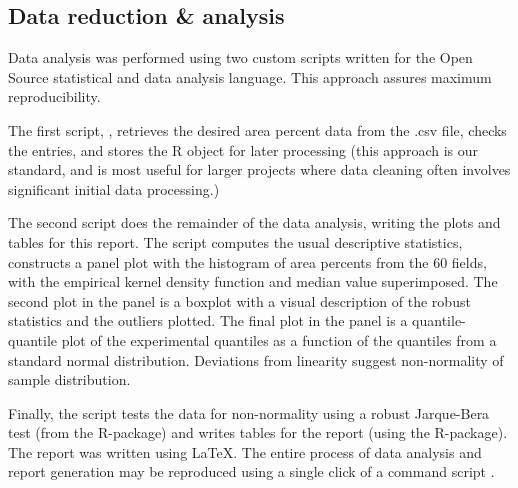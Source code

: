 \subsection{Data reduction \& analysis}

Data analysis was performed using two custom scripts written
for the Open Source  statistical and data analysis language.
This approach assures maximum reproducibility.

The first script, , retrieves the desired
area percent data from the .csv file, checks the entries, and
stores the R object for later processing (this approach is our
standard, and is most useful for larger projects where data
cleaning often involves significant initial data processing.)

The second script  does the remainder of
the data analysis, writing the plots and tables for this report.
The script computes the usual descriptive statistics, constructs
a panel plot with the histogram of area percents from the 60
fields, with the empirical kernel density function and median
value superimposed. The second plot in the panel is a boxplot
with a visual description of the robust statistics and the
outliers plotted. The final plot in the panel is a
quantile-quantile plot of the experimental quantiles as a
function of the quantiles from a standard normal distribution.
Deviations from linearity suggest non-normality of sample
distribution.

Finally, the script tests the data for non-normality using a
robust Jarque-Bera test (from the  R-package) and
writes tables for the report (using the  R-package).
The report was written using \LaTeX .
The entire process of data analysis and report generation may
be reproduced using a single click of a command script
.


\endinput
